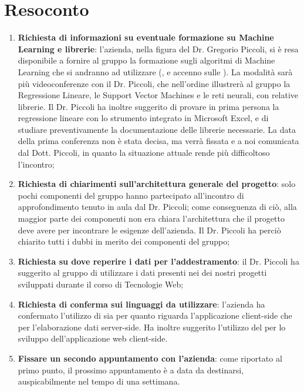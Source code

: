 \documentclass{article}
\begin{document}
\section{Resoconto}%
\label{resoconto}
\begin{enumerate}
  \item \textbf{Richiesta di informazioni su eventuale formazione su Machine Learning e librerie}: l'azienda, nella figura
  del Dr. Gregorio Piccoli, si è resa disponibile a fornire al gruppo la formazione
  sugli algoritmi di Machine Learning che si andranno ad utilizzare (,  e accenno sulle ).
  La modalità sarà più videoconferenze con il Dr. Piccoli, che nell'ordine illustrerà
  al gruppo la Regressione Lineare, le Support Vector Machines e le reti neurali, con relative librerie.
  Il Dr. Piccoli ha inoltre suggerito di provare in prima persona la regressione lineare con lo strumento
  integrato in Microsoft Excel, e di studiare preventivamente la documentazione delle librerie necessarie. La data
  della prima conferenza non è stata decisa, ma verrà fissata e a noi comunicata dal Dott. Piccoli, in quanto la situazione
  attuale rende più difficoltoso l'incontro;
  \item \textbf{Richiesta di chiarimenti sull'architettura generale del progetto}: solo pochi componenti del gruppo hanno
  partecipato all'incontro di approfondimento tenuto in aula dal Dr. Piccoli; come conseguenza di ciò,
  alla maggior parte dei componenti non era chiara l'architettura che il progetto deve avere per incontrare le
  esigenze dell'azienda. Il Dr. Piccoli ha perciò chiarito tutti i dubbi in merito dei componenti del gruppo;
  \item \textbf{Richiesta su dove reperire i dati per l'addestramento}: il Dr. Piccoli ha suggerito al gruppo di utilizzare
  i dati presenti nei  dei nostri progetti sviluppati durante il corso di Tecnologie Web;
  \item \textbf{Richiesta di conferma sui linguaggi da utilizzare}: l'azienda ha confermato l'utilizzo di  sia per
  quanto riguarda l'applicazione client-side che per l'elaborazione dati server-side. Ha inoltre suggerito
  l'utilizzo del   per lo sviluppo dell'applicazione web client-side.
  \item \textbf{Fissare un secondo appuntamento con l'azienda}: come riportato al primo punto, il prossimo appuntamento è a
  data da destinarsi, auspicabilmente  nel tempo di una settimana.
\end{enumerate}
\end{document}
